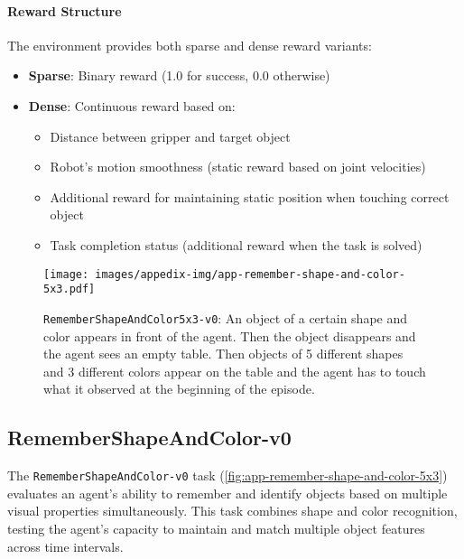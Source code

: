 \paragraph{Reward Structure} The environment provides both sparse and dense reward variants:
\begin{itemize}
    \item \textbf{Sparse}: Binary reward (1.0 for success, 0.0 otherwise)
    \item \textbf{Dense}: Continuous reward based on:
    \begin{itemize}
        \item Distance between gripper and target object
        \item Robot's motion smoothness (static reward based on joint velocities)
        \item Additional reward for maintaining static position when touching correct object
        \item Task completion status (additional reward when the task is solved)
    \end{itemize}
\end{itemize}

\newpage
\begin{figure*}[h!]
    \centering
    \texttt{[image: images/appedix-img/app-remember-shape-and-color-5x3.pdf]}
    \vspace{-15pt}
    \caption{\texttt{RememberShapeAndColor5x3-v0}: An object of a certain shape and color appears in front of the agent. Then the object disappears and the agent sees an empty table. Then objects of 5 different shapes and 3 different colors appear on the table and the agent has to touch what it observed at the beginning of the episode.}
    \label{fig:app-remember-shape-and-color-5x3}
    \vspace{-15pt}
\end{figure*}
\subsection{RememberShapeAndColor-v0}
\label{app:remember-shape-and-color}

The \texttt{RememberShapeAndColor-v0} task (\autoref{fig:app-remember-shape-and-color-5x3}) evaluates an agent's ability to remember and identify objects based on multiple visual properties simultaneously. This task combines shape and color recognition, testing the agent's capacity to maintain and match multiple object features across time intervals.

